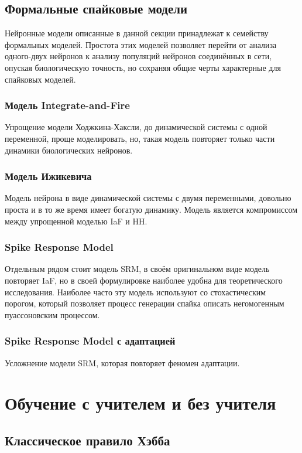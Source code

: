 \documentclass[a4paper,10pt]{article}
\begin{document}
\subsection{Формальные спайковые модели}   
\indent Нейронные модели описанные в данной секции принадлежат к семейству формальных моделей. Простота этих моделей позволяет перейти от анализа одного-двух нейронов к анализу популяций нейронов соединённых в сети, опуская биологическую точность, но сохраняя общие черты характерные для спайковых моделей.\\
\subsubsection{Модель Integrate-and-Fire}

\indent Упрощение модели Ходжкина-Хаксли, до динамической системы с одной переменной, проще моделировать, но, такая модель повторяет только части динамики биологических нейронов.

\subsubsection{Модель Ижикевича}
Модель нейрона в виде динамической системы с двумя переменными, довольно проста и в то же время имеет богатую динамику. Модель является компромиссом между упрощенной моделью IaF и HH. 

\subsubsection{Spike Response Model}
Отдельным рядом стоит модель SRM, в своём оригинальном виде модель повторяет IaF, но в своей формулировке наиболее удобна для теоретического исследования. Наиболее часто эту модель используют со   стохастическим порогом, который позволяет процесс генерации спайка описать негомогенным пуассоновским процессом.

\subsubsection{Spike Response Model с адаптацией}
Усложнение модели SRM, которая повторяет феномен адаптации.

\section{Обучение с учителем и без учителя}
\subsection{Классическое правило Хэбба}
\end{document}

